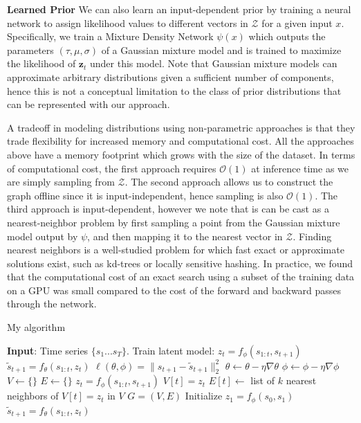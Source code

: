 \documentclass{article}
\begin{document}
\textbf{Learned Prior} \quad
We can also learn an input-dependent prior by training a neural network to assign likelihood values to different vectors in $\mathcal{Z}$ for a given input $x$.
Specifically, we train a Mixture Density Network \citep{mixture-density-networks} $\psi(x)$ which outputs the parameters $(\tau, \mu, \sigma)$ of a Gaussian mixture model and is trained to maximize the likelihood of $\bm{z}_t$ under this model.
Note that Gaussian mixture models can approximate arbitrary distributions given a sufficient number of components, hence this is not a conceptual limitation to the class of prior distributions that can be represented with our approach.

A tradeoff in modeling distributions using non-parametric approaches is that they trade flexibility for increased memory and computational cost.
All the approaches above have a memory footprint which grows with the size of the dataset.
In terms of computational cost, the first approach requires $\mathcal{O}(1)$ at inference time as we are simply sampling from $\mathcal{Z}$.
The second approach allows us to construct the graph offline since it is input-independent, hence sampling is also $\mathcal{O}(1)$.
The third approach is input-dependent, however we note that is can be cast as a nearest-neighbor problem by first sampling a point from the Gaussian mixture model output by $\psi$, and then mapping it to the nearest vector in $\mathcal{Z}$. Finding nearest neighbors is a well-studied problem for which fast exact or approximate solutions exist, such as kd-trees or locally sensitive hashing. In practice, we found that the computational cost of an exact search using a subset of the training data on a GPU was small compared to the cost of the forward and backward passes through the network.

\begin{algorithm}
  \caption{My algorithm}\label{algo}
  \begin{algorithmic}[1]
    \State \textbf{Input}: Time series $\{s_1...s_T\}$.
    \State Train latent model:
    \State $z_t = f_{\phi}(s_{1:t}, s_{t+1})$
    \State $\tilde{s}_{t+1} = f_{\theta}(s_{1:t}, z_t)$
    \State $\ell(\theta, \phi) = \|s_{t+1} - \tilde{s}_{t+1} \|_2^2$
    \State $\theta \leftarrow \theta - \eta \nabla \theta$
    \State $\phi \leftarrow \phi - \eta \nabla \phi$
    \EndWhile
    \State $V \leftarrow \{ \}$
    \State $E \leftarrow \{ \}$
    \State $z_t = f_{\phi}(s_{1:t}, s_{t+1})$
    \State $V[t] = z_t$
    \EndFor
    \State $E[t] \leftarrow $ list of $k$ nearest neighbors of $V[t] = z_t$ in $V$
    \EndFor
    \Return $G = (V, E)$
    \EndProcedure
    \State Initialize $z_1 = f_{\phi}(s_0, s_1)$
    \State $\tilde{s}_{t+1} = f_{\theta}(s_{1:t}, z_t)$
    \EndFor
    \EndProcedure
  \end{algorithmic}
\end{algorithm}
\end{document}

